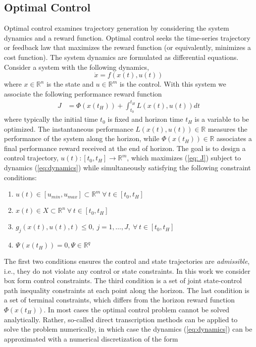 \documentclass{UnderReview}
\begin{document}
\subsection{Optimal Control}\label{section:Optimal Control}
Optimal control examines trajectory generation by considering the system dynamics and a reward function.  Optimal control seeks the time-series trajectory or feedback law that maximizes the reward function (or equivalently, minimizes a cost function).  The system dynamics are formulated as differential equations.  Consider a system with the following dynamics,
\begin{equation}\label{eq:dynamics}
	\dot x = f(x(t),u(t))
\end{equation}
where $x \in \mathbb{R}^n$ is the state and $u \in \mathbb{R}^m$ is the control.  With this system we associate the following performance reward function \cite{bertsekas1995dynamic}
\begin{align} \label{eq: J}
	J &= \Phi(x(t_H)) + \int_{t_0}^{t_H} L(x(t),u(t)) dt
\end{align}
where typically the initial time $t_0$ is fixed and horizon time $t_H$ is a variable to be optimized.  The instantaneous performance $L(x(t), u(t)) \in \mathbb{R}$ measures the performance of the system along the horizon, while $\Phi(x(t_H)) \in \mathbb{R}$ associates a final performance reward received at the end of horizon.  The goal is to design a control trajectory, $u(t):[t_0,t_H]\rightarrow \mathbb{R}^m$, which maximizes (\ref{eq: J}) subject to dynamics (\ref{eq:dynamics}) while simultaneously satisfying the following constraint conditions: 
\begin{enumerate}
	\item $u(t) \in [u_{min}, u_{max}] \subset \mathbb{R}^m ~\forall~ t\in[t_0,t_H]$
	\item $x(t)\in X \subset \mathbb{R}^n ~\forall~ t\in[t_0,t_H]$
	\item $g_j(x(t), u(t), t) \leq 0, ~j=1,\dots,J, ~\forall~ t\in[t_0,t_H]$
	\item $\Psi(x(t_H)) = 0, \Psi\in\mathbb{R}^q$
\end{enumerate}
The first two conditions ensures the control and state trajectories are \textit{admissible}, i.e., they do not violate any control or state constraints.  In this work we consider box form control constraints.  The third condition is a set of joint state-control path inequality constraints at each point along the horizon.  The last condition is a set of terminal constraints, which differs from the horizon reward function $\Phi(x(t_H))$.  In most cases the optimal control problem cannot be solved analytically.  Rather, so-called direct transcription methods \cite{kelly2017introduction} can be applied to solve the problem numerically, in which case the dynamics (\ref{eq:dynamics}) can be approximated with a numerical discretization of the form
\end{document}
